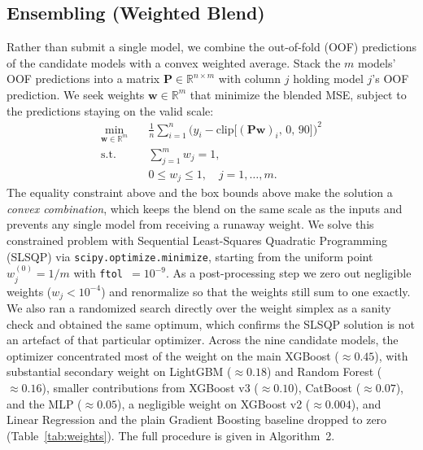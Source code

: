 \documentclass[journal]{IEEEtran}
\begin{document}
\subsection{Ensembling (Weighted Blend)}
\label{sec:blend}
Rather than submit a single model, we combine the out-of-fold (OOF) predictions
of the candidate models with a convex weighted average. Stack the $m$ models'
OOF predictions into a matrix $\mathbf{P}\in\mathbb{R}^{n\times m}$ with column
$j$ holding model $j$'s OOF prediction. We seek weights
$\mathbf{w}\in\mathbb{R}^{m}$ that minimize the blended MSE, subject to the
predictions staying on the valid scale:
\begin{align}
\min_{\mathbf{w}\in\mathbb{R}^{m}}\quad
& \frac{1}{n}\sum_{i=1}^{n}\Big(y_i-\mathrm{clip}\big[(\mathbf{P}\mathbf{w})_i,\,0,\,90\big]\Big)^{2}
\label{eq:blendobj}\\
\text{s.t.}\quad & \sum_{j=1}^{m}w_j = 1,
\label{eq:blendeq}\\
& 0 \le w_j \le 1,\quad j=1,\dots,m.
\label{eq:blendbox}
\end{align}
The equality constraint above and the box
bounds above make the solution a \emph{convex combination}, which
keeps the blend on the same scale as the inputs and prevents any single model
from receiving a runaway weight. We solve this constrained problem
with Sequential Least-Squares Quadratic Programming (SLSQP) via
\texttt{scipy.optimize.minimize}, starting from the uniform point
$w_j^{(0)}=1/m$ with \texttt{ftol}~$=10^{-9}$. As a post-processing step we zero
out negligible weights ($w_j<10^{-4}$) and renormalize so that
the weights still sum to one exactly. We also ran a randomized search directly
over the weight simplex as a sanity check and obtained the same optimum, which
confirms the SLSQP solution is not an artefact of that particular optimizer.
Across the nine candidate models, the optimizer concentrated most of the weight
on the main XGBoost ($\approx0.45$), with substantial secondary weight on
LightGBM ($\approx0.18$) and Random Forest ($\approx0.16$), smaller
contributions from XGBoost v3 ($\approx0.10$), CatBoost ($\approx0.07$), and the
MLP ($\approx0.05$), a negligible weight on XGBoost v2 ($\approx0.004$), and
Linear Regression and the plain Gradient Boosting baseline dropped to zero
(Table~\ref{tab:weights}). The full procedure is given in Algorithm~2.
\end{document}
